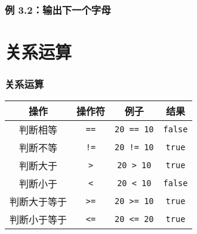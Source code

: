 \begin{frame}[fragile]
    \frametitle{例 3.2：输出下一个字母}

\end{frame}


\section{关系运算}

\begin{frame}[fragile]
    \frametitle{关系运算}

    \begin{table}[]
        \begin{tabular}{cccc}
            \toprule
            操作          & 操作符         & 例子                 & 结果              \\
            \midrule
            判断相等      & \lstinline|==| & \lstinline|20 == 10| & \lstinline|false| \\
            判断不等      & \lstinline|!=| & \lstinline|20 != 10| & \lstinline|true|  \\
            判断大于      & \lstinline|>|  & \lstinline|20 > 10|  & \lstinline|true|  \\
            判断小于      & \lstinline|<|  & \lstinline|20 < 10|  & \lstinline|false| \\
            判断大于等于  & \lstinline|>=| & \lstinline|20 >= 10| & \lstinline|true|  \\
            判断小于等于  & \lstinline|<=| & \lstinline|20 <= 20| & \lstinline|true|  \\
            \bottomrule
        \end{tabular}
    \end{table}
\end{frame}

